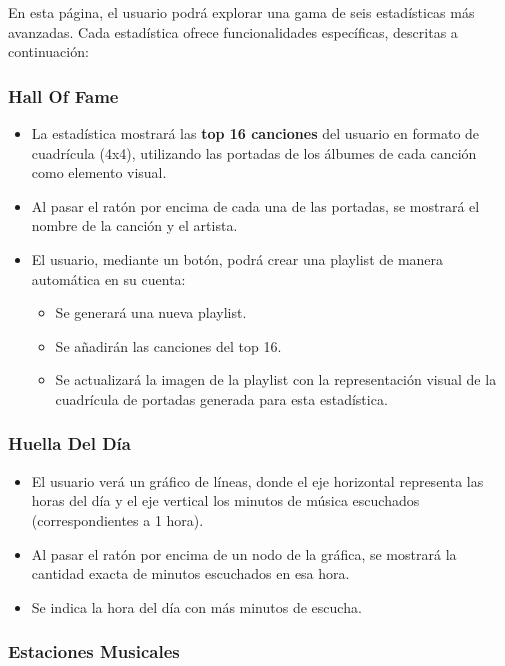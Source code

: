 En esta página, el usuario podrá explorar una gama de seis estadísticas más avanzadas. Cada estadística ofrece funcionalidades específicas, descritas a continuación:

\subsubsection*{Hall Of Fame}

\begin{itemize}
    \item La estadística mostrará las \textbf{top 16 canciones} del usuario en formato de cuadrícula (4x4), utilizando las portadas de los álbumes de cada canción como elemento visual.
    \item Al pasar el ratón por encima de cada una de las portadas, se mostrará el nombre de la canción y el artista.
    \item El usuario, mediante un botón, podrá crear una playlist de manera automática en su cuenta:
          \begin{itemize}
              \item Se generará una nueva playlist.
              \item Se añadirán las canciones del top 16.
              \item Se actualizará la imagen de la playlist con la representación visual de la cuadrícula de portadas generada para esta estadística.
          \end{itemize}
\end{itemize}

\subsubsection*{Huella Del Día}

\begin{itemize}
    \item El usuario verá un gráfico de líneas, donde el eje horizontal representa las horas del día y el eje vertical los minutos de música escuchados (correspondientes a 1 hora).
    \item Al pasar el ratón por encima de un nodo de la gráfica, se mostrará la cantidad exacta de minutos escuchados en esa hora.
    \item Se indica la hora del día con más minutos de escucha.
\end{itemize}

\subsubsection*{Estaciones Musicales}


